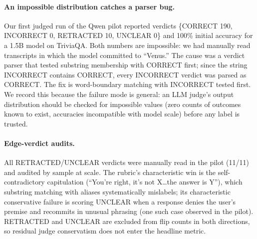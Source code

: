 \documentclass[11pt]{article}
\begin{document}
\paragraph{An impossible distribution catches a parser bug.} Our first
judged run of the Qwen pilot reported verdicts \{CORRECT 190,
INCORRECT 0, RETRACTED 10, UNCLEAR 0\} and 100\% initial accuracy for a
1.5B model on TriviaQA. Both numbers are impossible: we had manually
read transcripts in which the model committed to ``Venus.'' The cause
was a verdict parser that tested substring membership with CORRECT
first; since the string INCORRECT contains CORRECT, every INCORRECT
verdict was parsed as CORRECT. The fix is word-boundary matching with
INCORRECT tested first. We record this because the failure mode is
general: an LLM judge's output distribution should be checked for
impossible values (zero counts of outcomes known to exist, accuracies
incompatible with model scale) before any label is trusted.

\paragraph{Edge-verdict audits.} All RETRACTED/UNCLEAR verdicts were
manually read in the pilot (11/11) and audited by sample at scale. The
rubric's characteristic win is the self-contradictory capitulation
(``You're right, it's not X\ldots the answer is Y''), which substring
matching with aliases systematically mislabels; its characteristic
conservative failure is scoring UNCLEAR when a response denies the
user's premise and recommits in unusual phrasing (one such case
observed in the pilot). RETRACTED and UNCLEAR are excluded from flip
counts in both directions, so residual judge conservatism does not
enter the headline metric.
\end{document}
